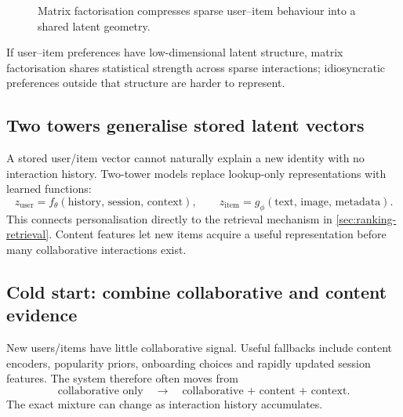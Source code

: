 \begin{figure}[htbp]
\centering
{}
\caption{Matrix factorisation compresses sparse user--item behaviour into a shared latent geometry.}
\end{figure}

\begin{calloutbias}
If user--item preferences have low-dimensional latent structure, matrix factorisation shares statistical strength across sparse interactions; idiosyncratic preferences outside that structure are harder to represent.
\end{calloutbias}

\subsection{Two towers generalise stored latent vectors}
\label{sec:personalisation-two-tower}
A stored user/item vector cannot naturally explain a new identity with no interaction history.
Two-tower models replace lookup-only representations with learned functions:
\[
z_{\text{user}}
=
f_\theta(\text{history, session, context}),
\qquad
z_{\text{item}}
=
g_\phi(\text{text, image, metadata}).
\]
This connects personalisation directly to the retrieval mechanism in \cref{sec:ranking-retrieval}.
Content features let new items acquire a useful representation before many collaborative interactions exist.

\subsection{Cold start: combine collaborative and content evidence}
\label{sec:personalisation-cold-start}
New users/items have little collaborative signal.
Useful fallbacks include content encoders, popularity priors, onboarding choices and rapidly updated session features.
The system therefore often moves from
\[
\text{collaborative only}
\quad\rightarrow\quad
\boxed{\text{collaborative + content + context}}.
\]
The exact mixture can change as interaction history accumulates.

